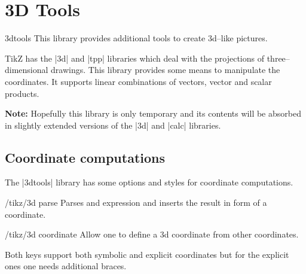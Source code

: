 \documentclass[a4paper]{ltxdoc}
\begin{document}
\section{3D Tools}
\begin{tikzlibrary}{3dtools}
    This library provides additional tools to create 3d--like pictures.
\end{tikzlibrary}

TikZ has the |3d| and |tpp| libraries which deal with the projections of
three--dimensional drawings. This library provides some means to manipulate
the coordinates. It supports linear combinations of vectors, vector and scalar
products.

\noindent\textbf{Note:} Hopefully this library is only temporary and its
contents will be absorbed in slightly extended versions of the |3d| and |calc|
libraries.

\subsection{Coordinate computations}
\label{sec:3DCoordinateComputations}


The |3dtools| library has some options and styles for coordinate computations.
\begin{key}{/tikz/3d parse}
        Parses and expression and inserts the result in form of a coordinate.
\end{key}
\begin{key}{/tikz/3d coordinate}
        Allow one to define a 3d coordinate from other coordinates.
\end{key}
Both keys support both symbolic and explicit coordinates but for the explicit
ones one needs additional braces.

\begin{codeexample}[width=6cm]
\end{codeexample}


\begin{codeexample}[width=6cm]
\end{codeexample}
\end{document}
